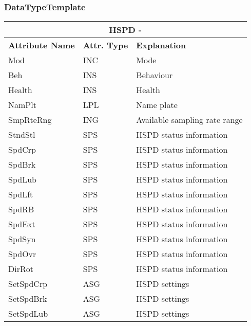     \subsubsection{DataTypeTemplate}
    \begin{table}[H]
    \begin{center}
    \begin{tabular}{|l|l|p{8.5cm}|}
            \hline
            \multicolumn{3}{|c|}{\cellcolor[gray]{0.8} \textbf{ HSPD}  -  } \\
            \hline
            \textbf{Attribute Name} & \textbf{Attr. Type} & \textbf{Explanation} \\
            \hline 
            Mod & INC & Mode \\
            \hline
            Beh & INS & Behaviour \\
            \hline
            Health & INS & Health \\
            \hline
            NamPlt & LPL & Name plate \\
            \hline
            SmpRteRng & ING & Available sampling rate range \\
            \hline
            StndStl & SPS & HSPD status information \\
            \hline
            SpdCrp & SPS & HSPD status information \\
            \hline
            SpdBrk & SPS & HSPD status information \\
            \hline
            SpdLub & SPS & HSPD status information \\
            \hline
            SpdLft & SPS & HSPD status information \\
            \hline
            SpdRB & SPS & HSPD status information \\
            \hline
            SpdExt & SPS & HSPD status information \\
            \hline
            SpdSyn & SPS & HSPD status information \\
            \hline
            SpdOvr & SPS & HSPD status information \\
            \hline
            DirRot & SPS & HSPD status information \\
            \hline
            SetSpdCrp & ASG & HSPD settings \\
            \hline
            SetSpdBrk & ASG & HSPD settings \\
            \hline
            SetSpdLub & ASG & HSPD settings \\

\end{tabular}
\end{center}
\end{table}
